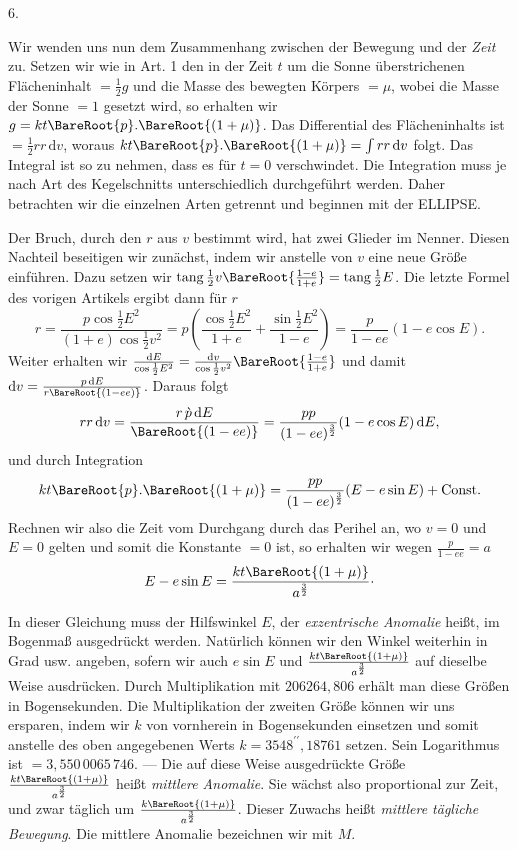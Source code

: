 \par{}
\begin{center}
6.
\end{center}
Wir wenden uns nun dem Zusammenhang zwischen der Bewegung und der \emph{Zeit} zu. Setzen wir wie in Art. 1 den in der Zeit $t$ um die Sonne überstrichenen Flächeninhalt $= \frac{1}{2}g$ und die Masse des bewegten Körpers $= \mu$, wobei die Masse der Sonne $= 1$ gesetzt wird, so erhalten wir $g = kt\BareRoot{p}.\BareRoot{(1+\mu)}$. Das Differential des Flächeninhalts ist $= \frac{1}{2}rr\,\mathrm{d}v$, woraus $kt\BareRoot{p}.\BareRoot{(1+\mu)}
= \int rr\,\mathrm{d}v$ folgt. Das Integral ist so zu nehmen, dass es für $t=0$ verschwindet. Die Integration muss je nach Art des Kegelschnitts unterschiedlich durchgeführt werden. Daher betrachten wir die einzelnen Arten getrennt und beginnen mit der ELLIPSE.

Der Bruch, durch den $r$ aus $v$ bestimmt wird, hat zwei Glieder im Nenner. Diesen Nachteil beseitigen wir zunächst, indem wir anstelle von $v$ eine neue Größe einführen. Dazu setzen wir $\operatorname{tang}\frac{1}{2}v\BareRoot{\frac{1-e}{1+e}}
= \operatorname{tang}\frac{1}{2}E$. Die letzte Formel des vorigen Artikels ergibt dann für $r$
\[
r = \frac{p\cos\frac{1}{2}E^2}{(1+e)\cos\frac{1}{2}v^2} = p\left(\frac{\cos\frac{1}{2}E^2}{1+e}+\frac{\sin\frac{1}{2}E^2}{1-e}\right) = \frac{p}{1-ee}(1-e\cos E).
\]
Weiter erhalten wir $\frac{\mathrm{d}E}{\cos\frac{1}{2}E^2} = \frac{\mathrm{d}v}{\cos\frac{1}{2}v^2}\BareRoot{\frac{1-e}{1+e}}$ und damit $\mathrm{d}v = \frac{p\,\mathrm{d}E}{r\BareRoot{(1-ee)}}$. Daraus folgt
\[
rr\,\mathrm{d}v = \frac{r\,\grave{p}\,\mathrm{d}E}{\BareRoot{(1-ee)}} = \frac{pp}{(1-ee)^{\frac{3}{2}}}(1-e\cos E)\,\mathrm{d}E,
\]
und durch Integration
\[
kt\BareRoot{p}.\BareRoot{(1+\mu)} = \frac{pp}{(1-ee)^{\frac{3}{2}}}(E-e\sin E)+\mathrm{Const.}
\]
Rechnen wir also die Zeit vom Durchgang durch das Perihel an, wo $v=0$ und $E=0$ gelten
und somit die Konstante $= 0$ ist, so erhalten wir wegen $\frac{p}{1-ee}=a$
\[
E-e\sin E = \frac{kt\BareRoot{(1+\mu)}}{a^{\frac{3}{2}}}\cdot
\]

In dieser Gleichung muss der Hilfswinkel $E$, der \emph{exzentrische Anomalie} heißt, im Bogenmaß ausgedrückt werden. Natürlich können wir den Winkel weiterhin in Grad usw. angeben, sofern wir auch $e\sin E$ und $\frac{kt\BareRoot{(1+\mu)}}{a^{\frac{3}{2}}}$ auf dieselbe Weise ausdrücken. Durch Multiplikation mit $206264{,}806$ erhält man diese Größen in Bogensekunden. Die Multiplikation der zweiten Größe können wir uns ersparen, indem wir $k$ von vornherein in Bogensekunden einsetzen und somit anstelle des oben angegebenen Werts $k = 3548^{\prime\prime}{,}18761$ setzen. Sein Logarithmus ist $= 3{,}550\,0065\,746$. — Die auf diese Weise ausgedrückte Größe $\frac{kt\BareRoot{(1+\mu)}}{a^{\frac{3}{2}}}$ heißt \emph{mittlere Anomalie}. Sie wächst also proportional zur Zeit, und zwar täglich um $\frac{k\BareRoot{(1+\mu)}}{a^{\frac{3}{2}}}$. Dieser Zuwachs heißt \emph{mittlere tägliche Bewegung}. Die mittlere Anomalie bezeichnen wir mit $M$.
